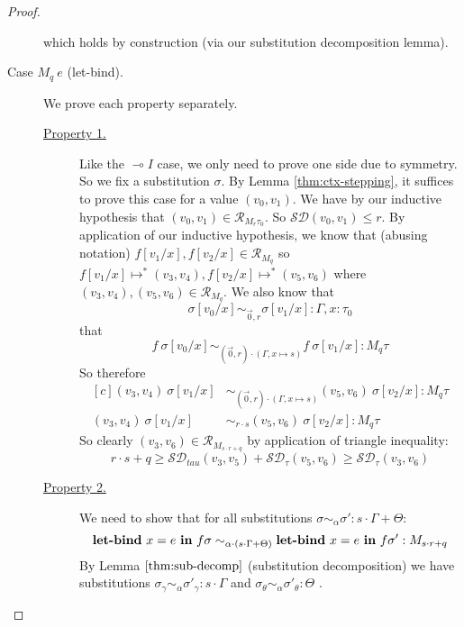 \begin{proof}
\begin{description}
      which holds by construction (via our substitution decomposition lemma).
    \item[Case $M_q~e$ (let-bind).] 
      We prove each property separately.
      \begin{description}
        \item[\underline{Property 1.}]
          Like the $\multimap I$ case, we only need to prove one side due to
          symmetry. So we fix a substitution $\sigma$. By Lemma
          \ref{thm:ctx-stepping}, it suffices to prove this case for a value
          $(v_0, v_1)$. 
          We have by our inductive hypothesis that $(v_0, v_1) \in \mathcal{R}_{M_r
          \tau_0}$. So $\mathcal{SD}(v_0, v_1) \leq r$. By application of our
          inductive hypothesis, we know that (abusing notation) 
          $f[v_1/x], f[v_2/x] \in \mathcal{R}_{M_q}$ so
          $f[v_1/x] \mapsto^{*} (v_3, v_4), f[v_2/x] \mapsto^{*} (v_5, v_6)$ where 
          $(v_3, v_4), (v_5, v_6) \in \mathcal{R}_{M_q}$.
          We also know that 
          $$\sigma[v_0/x] \sim_{\vec{0}, r} \sigma[v_1/x] : \Gamma, x : \tau_0$$
          that
          $$f~\sigma[v_0/x] \sim_{(\vec{0},r) \cdot (\Gamma, x \mapsto s)} f~\sigma[v_1/x] : M_q \tau$$
          So therefore
          \begin{equation}
            \begin{aligned}[c]
              (v_3, v_4)~\sigma[v_1/x] 
                &\sim_{(\vec{0},r) \cdot (\Gamma, x \mapsto s)} 
              (v_5, v_6)~\sigma[v_2/x] : M_q \tau \\
              (v_3, v_4)~\sigma[v_1/x] 
                &\sim_{r \cdot s} 
              (v_5, v_6)~\sigma[v_2/x] : M_q \tau
            \end{aligned}
          \end{equation}
          So clearly $(v_3, v_6) \in \mathcal{R}_{M_{s \cdot r + q}}$ by
          application of triangle inequality: 
          $$
          r \cdot s + q \geq
          \mathcal{SD}_{tau}(v_3, v_5) + \mathcal{SD}_{\tau}(v_5, v_6) \geq
          \mathcal{SD}_{\tau}(v_3, v_6)
          $$
        \item[\underline{Property 2.}]
          We need to show that for all substitutions $\sigma \sim_{\alpha}
          \sigma' : s \cdot \Gamma + \Theta$:
          \begin{equation}
            \label{eq:lb-prop2}
          \textbf{let-bind}~x = e \ \textbf{in} \ f \sigma \sim_{\alpha \cdot (s
          \cdot \Gamma + \Theta)} \textbf{let-bind}~x = e \ \textbf{in} \ f \sigma' :
          M_{s \cdot r + q}
          \end{equation}
          By Lemma $\ref{thm:sub-decomp}$ (substitution decomposition) we have
          substitutions 
          $\sigma_{\gamma} \sim_{\alpha} \sigma'_{\gamma} : s \cdot \Gamma$
          and $\sigma_{\theta} \sim_{\alpha} \sigma'_{\theta} : \Theta$ .


\end{description}
\end{description}
\end{proof}
